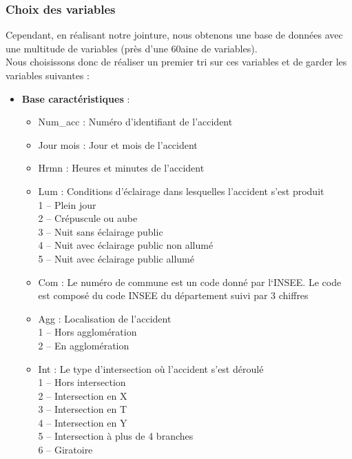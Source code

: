 \documentclass[french,]{tp}
\providecommand{\tightlist}{%
  \setlength{\itemsep}{0pt}\setlength{\parskip}{0pt}}
\begin{document}
\hypertarget{choix-des-variables}{%
\subsubsection{Choix des variables}\label{choix-des-variables}}

Cependant, en réalisant notre jointure, nous obtenons une base de données avec une multitude de variables (près d'une 60aine de variables).\\
Nous choisissons donc de réaliser un premier tri sur ces variables et de garder les variables suivantes :

\begin{itemize}
\tightlist
\item
  \textbf{Base caractéristiques} :

  \begin{itemize}
  \item
    Num\_acc : Numéro d'identifiant de l'accident
  \item
    Jour mois : Jour et mois de l'accident
  \item
    Hrmn : Heures et minutes de l'accident
  \item
    Lum : Conditions d'éclairage dans lesquelles l'accident s'est produit\\
    1 -- Plein jour\\
    2 -- Crépuscule ou aube\\
    3 -- Nuit sans éclairage public\\
    4 -- Nuit avec éclairage public non allumé\\
    5 -- Nuit avec éclairage public allumé
  \item
    Com : Le numéro de commune est un code donné par l`INSEE. Le code est composé du code INSEE du département suivi par 3 chiffres
  \item
    Agg : Localisation de l'accident\\
    1 -- Hors agglomération\\
    2 -- En agglomération
  \item
    Int : Le type d'intersection où l'accident s'est déroulé\\
    1 -- Hors intersection\\
    2 -- Intersection en X\\
    3 -- Intersection en T\\
    4 -- Intersection en Y\\
    5 -- Intersection à plus de 4 branches\\
    6 -- Giratoire\\

\end{itemize}
\end{itemize}
\end{document}
